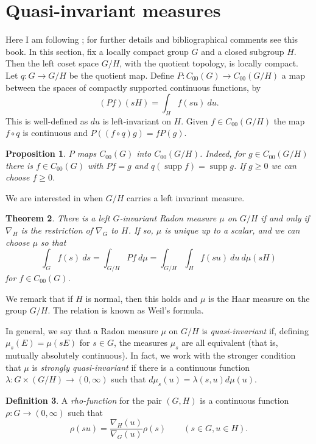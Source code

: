 \documentclass[11pt,a4paper]{article}
\newtheorem{theorem}{Theorem}[section]
\newtheorem{proposition}[theorem]{Proposition}
\theoremstyle{definition}
\newtheorem{definition}[theorem]{Definition}
\newcommand{\supp}{\operatorname{supp}}
\begin{document}
\section{Quasi-invariant measures}

Here I am following \cite{fol}; for further details and bibliographical comments see this book.
In this section, fix a locally compact group $G$ and a closed subgroup $H$.  Then the left
coset space $G/H$, with the quotient topology, is locally compact.  Let $q:G\rightarrow G/H$
be the quotient map.  Define $P:C_{00}(G)\rightarrow C_{00}(G/H)$ a map between the spaces of
compactly supported continuous functions, by
\[ (Pf)(sH) = \int_H f(su) \ du. \]
This is well-defined as $du$ is left-invariant on $H$.  Given $f\in C_{00}(G/H)$ the map
$f\circ q$ is continuous and $P((f\circ q) g) = f P(g)$.

\begin{proposition}
$P$ maps $C_{00}(G)$ into $C_{00}(G/H)$.  Indeed, for $g\in C_{00}(G/H)$ there is
$f\in C_{00}(G)$ with $Pf = g$ and $q(\supp f) = \supp g$.  If $g\geq 0$ we can choose
$f\geq 0$.
\end{proposition}

We are interested in when $G/H$ carries a left invariant measure.

\begin{theorem}
There is a left $G$-invariant Radon measure $\mu$ on $G/H$ if and only if $\nabla_H$ is the
restriction of $\nabla_G$ to $H$.  If so, $\mu$ is unique up to a scalar, and we can choose
$\mu$ so that
\[ \int_G f(s) \ ds = \int_{G/H} Pf \ d\mu = \int_{G/H} \int_H f(su) \ du \ d\mu(sH) \]
for $f\in C_{00}(G)$.
\end{theorem}

We remark that if $H$ is normal, then this holds and $\mu$ is the Haar measure on the group
$G/H$.  The relation is known as Weil's formula.

In general, we say that a Radon measure $\mu$ on $G/H$ is \emph{quasi-invariant} if,
defining $\mu_s(E) = \mu(sE)$ for $s\in G$, the measures $\mu_s$ are all equivalent
(that is, mutually absolutely continuous).  In fact, we work with the stronger condition
that $\mu$ is \emph{strongly quasi-invariant} if there is a continuous function
$\lambda : G \times (G/H) \rightarrow (0,\infty)$ such that $d\mu_s(u) = \lambda(s,u) d\mu(u)$.

\begin{definition}
A \emph{rho-function} for the pair $(G,H)$ is a continuous function $\rho:G\rightarrow
(0,\infty)$ such that
\[ \rho(su) = \frac{\nabla_H(u)}{\nabla_G(u)} \rho(s) \qquad (s\in G, u\in H). \]
\end{definition}
\end{document}
